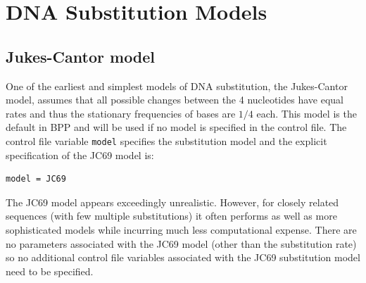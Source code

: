 \documentclass{book}
\numberwithin{equation}{section} \renewcommand{\baselinestretch}{0.55}
\begin{document}
\newpage
\section{DNA Substitution Models}
\subsection{Jukes-Cantor model}
One of the earliest and simplest models of DNA substitution, the
Jukes-Cantor model, assumes that all possible changes
between the 4 nucleotides have equal rates and thus the stationary
frequencies of bases are $1/4$ each. This model is the default in BPP
and will be used if no model is specified in the control file. The
control file variable \texttt{model} specifies the substitution model
and the explicit specification of the JC69 model is:
\begin{verbatim}
model = JC69
\end{verbatim}
The JC69 model appears exceedingly unrealistic. However, for closely
related sequences (with few multiple substitutions) it often performs
as well as more sophisticated models while incurring much less
computational expense. There are no parameters associated with the
JC69 model (other than the substitution rate) so no additional control
file variables associated with the JC69 substitution model need to be
specified.
\end{document}
